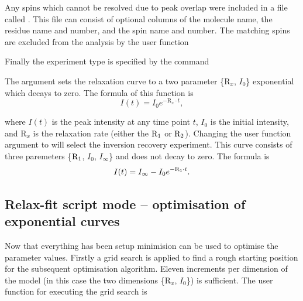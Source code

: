 
Any spins which cannot be resolved due to peak overlap were included in a file called .  This file can consist of optional columns of the molecule name, the residue name and number, and the spin name and number.  The matching spins are excluded from the analysis by the user function


Finally the experiment type is specified by the command


The argument  sets the relaxation curve to a two parameter \{$\mathrm{R}_x$, $I_0$\} exponential which decays to zero.  The formula of this function is
\begin{equation}
 I(t) = I_0 e^{-\mathrm{R}_x \cdot t},
\end{equation}

\noindent where $I(t)$ is the peak intensity at any time point $t$, $I_0$ is the initial intensity, and $\mathrm{R}_x$ is the relaxation rate (either the $\mathrm{R}_1$ or $\mathrm{R}_2$).  Changing the user function argument to  will select the inversion recovery experiment.  This curve consists of three paremeters \{$\mathrm{R}_1$, $I_0$, $I_{\infty}$\} and does not decay to zero.  The formula is
\begin{equation}
 I(t) = I_{\infty} - I_0 e^{-\mathrm{R}_1 \cdot t}.
\end{equation}




\subsection{Relax-fit script mode -- optimisation of exponential curves}

Now that everything has been setup minimision can be used to optimise the parameter values.  Firstly a grid search is applied to find a rough starting position for the subsequent optimisation algorithm.  Eleven increments per dimension of the model (in this case the two dimensions \{$\mathrm{R}_x$, $I_0$\}) is sufficient.  The user function for executing the grid search is


